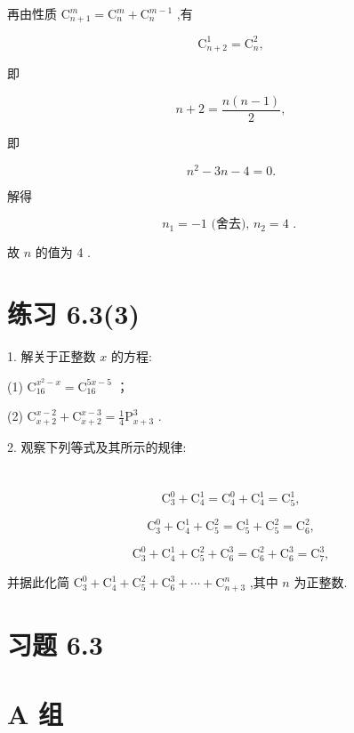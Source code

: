 \documentclass[10pt]{article}
\begin{document}
再由性质 \({\mathrm{C}}_{n + 1}^{m} = {\mathrm{C}}_{n}^{m} + {\mathrm{C}}_{n}^{m - 1}\) ,有

\[
{\mathrm{C}}_{n + 2}^{1} = {\mathrm{C}}_{n}^{2},
\]

即

\[
n + 2 = \frac{n\left( {n - 1}\right) }{2},
\]

即

\[
{n}^{2} - {3n} - 4 = 0.
\]

解得

\[
{n}_{1} =  - 1\text{ (舍去), }{n}_{2} = 4\text{ . }
\]

故 \(n\) 的值为 4 .

\section*{练习 6.3(3)}

1. 解关于正整数 \(x\) 的方程:

(1) \({\mathrm{C}}_{16}^{{x}^{2} - x} = {\mathrm{C}}_{16}^{{5x} - 5}\) ；

(2) \({\mathrm{C}}_{x + 2}^{x - 2} + {\mathrm{C}}_{x + 2}^{x - 3} = \frac{1}{4}{\mathrm{P}}_{x + 3}^{3}\) .

2. 观察下列等式及其所示的规律:

\section*{}

\[
{\mathrm{C}}_{3}^{0} + {\mathrm{C}}_{4}^{1} = {\mathrm{C}}_{4}^{0} + {\mathrm{C}}_{4}^{1} = {\mathrm{C}}_{5}^{1},
\]

\[
{\mathrm{C}}_{3}^{0} + {\mathrm{C}}_{4}^{1} + {\mathrm{C}}_{5}^{2} = {\mathrm{C}}_{5}^{1} + {\mathrm{C}}_{5}^{2} = {\mathrm{C}}_{6}^{2},
\]

\[
{\mathrm{C}}_{3}^{0} + {\mathrm{C}}_{4}^{1} + {\mathrm{C}}_{5}^{2} + {\mathrm{C}}_{6}^{3} = {\mathrm{C}}_{6}^{2} + {\mathrm{C}}_{6}^{3} = {\mathrm{C}}_{7}^{3},
\]

并据此化简 \({\mathrm{C}}_{3}^{0} + {\mathrm{C}}_{4}^{1} + {\mathrm{C}}_{5}^{2} + {\mathrm{C}}_{6}^{3} + \cdots  + {\mathrm{C}}_{n + 3}^{n}\) ,其中 \(n\) 为正整数.

\section*{习题 6.3}

\section*{A 组}
\end{document}
